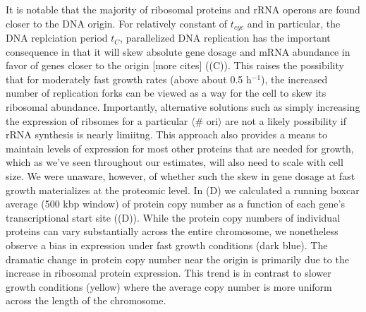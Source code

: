 It is notable that the majority of ribosomal proteins and rRNA operons are found
closer to the DNA origin. For relatively constant of $t_{cyc}$ and in
particular, the DNA replciation period $t_C$, parallelized DNA replication has
the important consequence in that it will skew absolute gene dosage and mRNA
abundance in favor of genes closer to the origin \citep{scholz2019} [more cites]
((C)). This raises the possibility that for
moderately fast growth rates (above about 0.5 h$^{-1}$), the increased number of
replication forks can be viewed as a way for the cell to skew its ribosomal
abundance. Importantly, alternative solutions such as simply increasing the
expression of ribsomes for a particular $\langle$\# ori$\rangle$ are not a
likely possibility if rRNA synthesis is nearly limiitng. This approach also
provides a means to maintain levels of expression for most other proteins that
are needed  for growth, which as we've seen throughout our estimates, will also
need to scale with cell size. We were unaware, however, of whether such the skew
in  gene dosage at fast growth materializes at the proteomic level. In
(D) we calculated a running boxcar average (500 kbp
window) of protein copy number as a function of each gene's transcriptional
start site ((D)). While the protein copy numbers of
individual proteins can vary substantially across the entire chromosome, we
nonetheless observe a bias in expression under fast growth conditions (dark
blue). The dramatic change in protein copy number near the origin is primarily
due to the increase in ribosomal protein expression. This trend is in contrast
to slower growth conditions (yellow) where the average copy number is more
uniform across the length of the chromosome.

